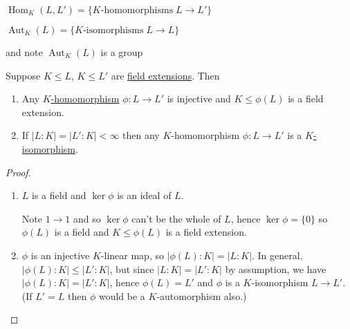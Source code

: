 \documentclass{article}
\DeclareMathOperator{\Aut}{Aut}
\DeclareMathOperator{\Hom}{Hom}
\begin{document}

\begin{notation}\hypertarget{not:hom}{}
    $ \Hom_K(L, L') = \{K\text{-homomorphisms} \; L \to L'\} $
\end{notation}

\begin{notation}
    \hypertarget{not:aut}{
    $ \Aut_K(L) = \{K\text{-isomorphisms} \; L \to L\} $
    } and note $\Aut_K(L)$ is a group
\end{notation}

\begin{nlemma}\label{lem:1.21}
    Suppose $K \leq L$, $K \leq L'$ are \hyperlink{def:fieldExt}{field extensions}. Then
    \begin{enumerate}[label=(\roman*)]
        \item Any \hyperlink{def:homo}{$K$-homomorphism} $\phi:L \to L'$ is injective and $K \leq \phi(L)$ is a field extension.
        \item If $|L:K| = |L':K| < \infty$ then any $K$-homomorphism $\phi:L \to L'$ is a \hyperlink{def:homo}{$K$-isomorphism}.
    \end{enumerate}
\end{nlemma}

\begin{proof}
    \leavevmode
    \begin{enumerate}[label=(\roman*)]
        \item $L$ is a field and $\ker \phi$ is an ideal of $L$.

            Note $1 \to 1$ and so $\ker \phi$ can't be the whole of $L$, hence $\ker \phi = \{0\}$ so $\phi(L)$ is a field and $K \leq \phi(L)$ is a field extension.
        \item $\phi$ is an injective $K$-linear map, so $|\phi(L):K| = |L:K|$. In general, $|\phi(L):K| \leq |L':K|$, but since $|L:K| = |L':K|$ by assumption, we have $|\phi(L):K| = |L':K|$, hence $\phi(L) = L'$ and $\phi$ is a $K$-isomorphism $L \to L'$.  (If $L' = L$ then $\phi$ would be a $K$-automorphism also.)
    \end{enumerate}
\end{proof}
\end{document}
